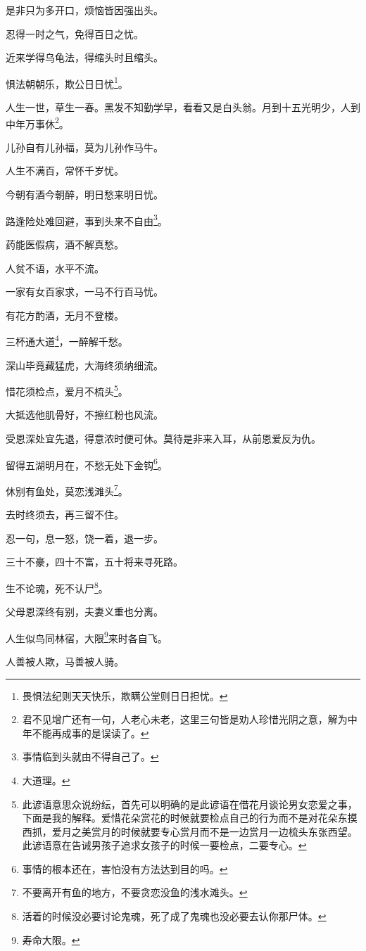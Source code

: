 \documentclass[12pt,oneside]{book}
\begin{document}
是非只为多开口，烦恼皆因强出头。

忍得一时之气，免得百日之忧。

近来学得乌龟法，得缩头时且缩头。

惧法朝朝乐，欺公日日忧\footnote{畏惧法纪则天天快乐，欺瞒公堂则日日担忧。}。

人生一世，草生一春。黑发不知勤学早，看看又是白头翁。月到十五光明少，人到中年万事休\footnote{君不见增广还有一句，人老心未老，这里三句皆是劝人珍惜光阴之意，解为中年不能再成事的是误读了。}。

儿孙自有儿孙福，莫为儿孙作马牛。

人生不满百，常怀千岁忧。

今朝有酒今朝醉，明日愁来明日忧。

路逢险处难回避，事到头来不自由\footnote{事情临到头就由不得自己了。}。

药能医假病，酒不解真愁。

人贫不语，水平不流。

一家有女百家求，一马不行百马忧。

有花方酌酒，无月不登楼。

三杯通大道\footnote{大道理。}，一醉解千愁。

深山毕竟藏猛虎，大海终须纳细流。

惜花须检点，爱月不梳头\footnote{此谚语意思众说纷纭，首先可以明确的是此谚语在借花月谈论男女恋爱之事，下面是我的解释。爱惜花朵赏花的时候就要检点自己的行为而不是对花朵东摸西抓，爱月之美赏月的时候就要专心赏月而不是一边赏月一边梳头东张西望。此谚语意在告诫男孩子追求女孩子的时候一要检点，二要专心。}。

大抵选他肌骨好，不擦红粉也风流。

受恩深处宜先退，得意浓时便可休。莫待是非来入耳，从前恩爱反为仇。

留得五湖明月在，不愁无处下金钩\footnote{事情的根本还在，害怕没有方法达到目的吗。}。

休别有鱼处，莫恋浅滩头\footnote{不要离开有鱼的地方，不要贪恋没鱼的浅水滩头。}。

去时终须去，再三留不住。

忍一句，息一怒，饶一着，退一步。

三十不豪，四十不富，五十将来寻死路。

生不论魂，死不认尸\footnote{活着的时候没必要讨论鬼魂，死了成了鬼魂也没必要去认你那尸体。}。

父母恩深终有别，夫妻义重也分离。

人生似鸟同林宿，大限\footnote{寿命大限。}来时各自飞。

人善被人欺，马善被人骑。
\end{document}
